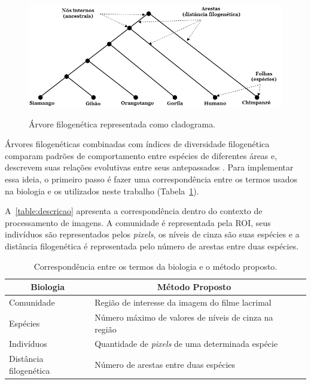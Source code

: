 \begin{figure}[ht!]
    \centering
    \caption{Árvore filogenética representada como cladograma.}
     \includegraphics[width=12cm]{figs/Cladograma2.png}
    \label{fig:Cladograma}
\end{figure}

Árvores filogenéticas combinadas com índices de diversidade filogenética comparam padrões de comportamento entre espécies de diferentes áreas e, descrevem suas relações evolutivas entre seus antepassados \cite{vane1991protect}. Para implementar essa ideia, o primeiro passo é fazer uma correspondência entre os termos usados na biologia e os utilizados neste trabalho (Tabela~\ref{table:descricao}).

A~\autoref{table:descricao} apresenta a correspondência dentro do contexto de processamento de imagens. A comunidade é representada pela ROI, seus indivíduos são representados pelos \textit{pixels}, os níveis de cinza são suas espécies e a distância filogenética é representada pelo número de arestas entre duas espécies.

\begin{table}[!ht]
\centering
\onehalfspacing
{}
\caption{Correspondência entre os termos da biologia e o método proposto.}
\label{table:descricao}
\begin{tabular}{lp{7cm}l}
\hline
\multicolumn{1}{c}{\textbf{Biologia}} & \multicolumn{1}{c}{\textbf{Método Proposto}}          \\ \hline \hline
Comunidade                            & Região de interesse da imagem do filme lacrimal      \\
Espécies                              & Número máximo de valores de níveis de cinza na região \\
Indivíduos                             & Quantidade de \textit{pixels} de uma determinada espécie \\
Distância filogenética                & Número de arestas entre duas espécies                 \\ \hline
\end{tabular}
\end{table}
\FloatBarrier

